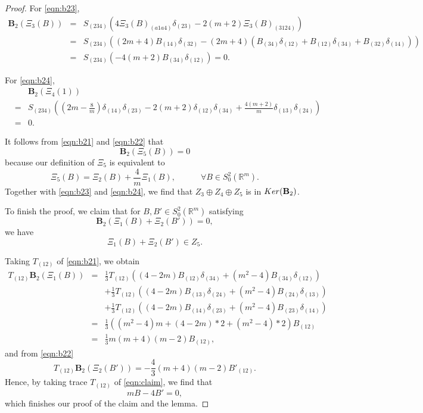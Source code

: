 \documentclass[10pt,a4paper]{amsart}
\newcommand{\Real}{\mathbb R}
\begin{document}
\begin{proof}
	For \eqref{eqn:b23}, 
	\begin{eqnarray*}
		{\mathbf B}_2(\Xi_3(B)) &=&S_{(234)} (4 \Xi_3(B)_{(a1a4)}\delta_{(23)} - 2(m+2) \Xi_3(B)_{(3124)}) \\
					&=& S_{(234)} \left( (2m+4)B_{(14)}\delta_{(32)} -(2m+4)(B_{(34)}\delta_{(12)}+B_{(12)}\delta_{(34)}+B_{(32)}\delta_{(14)}) \right) \\
					&=&S_{(234)}\left( -4(m+2) B_{(34)}\delta_{(12)} \right) =0.
	\end{eqnarray*}

	For \eqref{eqn:b24},
	\begin{eqnarray*}
	&& {\mathbf B}_2(\Xi_4(1))\\
	&=&S_{(234)} \left( (2m-\frac{8}{m}) \delta_{(14)}\delta_{(23)}-2(m+2)\delta_{(12)}\delta_{(34)}+ \frac{4(m+2)}{m}\delta_{(13)}\delta_{(24)} \right) \\
	&=&0.
	\end{eqnarray*}

	It follows from \eqref{eqn:b21} and \eqref{eqn:b22} that
	$$
	{\mathbf B}_2(\Xi_5(B))=0
	$$
	because our definition of $\Xi_5$ is equivalent to
	$$
	\Xi_5(B)= \Xi_2(B) + \frac{4}{m} \Xi_1(B), \qquad \text{} \quad \forall B\in S_0^2(\Real^m).
	$$
	Together with \eqref{eqn:b23} and \eqref{eqn:b24}, we find that $Z_3\oplus Z_4\oplus Z_5$ is in ${\rm Ker}({\mathbf B}_2)$. 

	To finish the proof, we claim that for $B, B'\in S^2_0(\Real^m)$ satisfying
	\begin{equation}
		\label{eqn:claim}
		{\mathbf B}_2 \left( \Xi_1(B)+ \Xi_2(B') \right)=0,
	\end{equation}
	we have
	$$
	\Xi_1(B)+\Xi_2(B')\in Z_5.
	$$

	Taking $T_{(12)}$ of \eqref{eqn:b21}, we obtain
	\begin{eqnarray*}
		T_{(12)} {\mathbf B}_2(\Xi_1(B)) &=& \frac{1}{3}T_{(12)} \left( (4-2m)B_{(12)}\delta_{(34)} + (m^2-4) B_{(34)}\delta_{(12)} \right) \\
						 &&+  \frac{1}{3}T_{(12)} \left( (4-2m)B_{(13)}\delta_{(24)} + (m^2-4) B_{(24)}\delta_{(13)} \right) \\
						 &&+  \frac{1}{3}T_{(12)} \left( (4-2m)B_{(14)}\delta_{(23)} + (m^2-4) B_{(23)}\delta_{(14)} \right) \\
						 &=& \frac{1}{3}\left( (m^2-4)m+ (4-2m)*2 + (m^2-4)*2 \right) B_{(12)}\\
						 &=&\frac{1}{3}m(m+4)(m-2) B_{(12)},
	\end{eqnarray*}
	and from \eqref{eqn:b22}
	$$
	T_{(12)} {\mathbf B}_2(\Xi_2(B')) = -\frac{4}{3}(m+4)(m-2) B'_{(12)}.
	$$
	Hence, by taking trace $T_{(12)}$ of \eqref{eqn:claim}, we find that
	$$
	mB-4B'=0,
	$$
	which finishes our proof of the claim and the lemma.
\end{proof}
\end{document}
